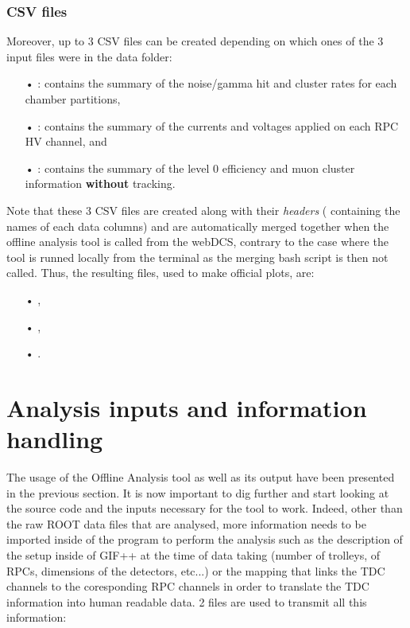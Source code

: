 		\subsubsection{CSV files}
		\label{app2:sssec:CSV}

	Moreover, up to 3 CSV files can be created depending on which ones of the 3 input files were in the data folder:

	\begin{itemize}
		\item[•]  : contains the summary of the noise/gamma hit and cluster rates for each chamber partitions,
		\item[•]  : contains the summary of the currents and voltages applied on each RPC HV channel, and
		\item[•]  : contains the summary of the level 0 efficiency and muon cluster information \textbf{without} tracking.
	\end{itemize}
	
	Note that these 3 CSV files are created along with their \textit{headers} ( containing the names of each data columns) and are automatically merged together when the offline analysis tool is called from the webDCS, contrary to the case where the tool is runned locally from the terminal as the merging bash script is then not called. Thus, the resulting files, used to make official plots, are:

	\begin{itemize}
		\item[•]  ,
		\item[•]  ,
		\item[•]  .
	\end{itemize}
	
\section{Analysis inputs and information handling}
\label{app2:sec:inputs}
	
	The usage of the Offline Analysis tool as well as its output have been presented in the previous section. It is now important to dig further and start looking at the source code and the inputs necessary for the tool to work. Indeed, other than the raw ROOT data files that are analysed, more information needs to be imported inside of the program to perform the analysis such as the description of the setup inside of GIF++ at the time of data taking (number of trolleys, of RPCs, dimensions of the detectors, etc...) or the mapping that links the TDC channels to the coresponding RPC channels in order to translate the TDC information into human readable data. 2 files are used to transmit all this information:\\
	
